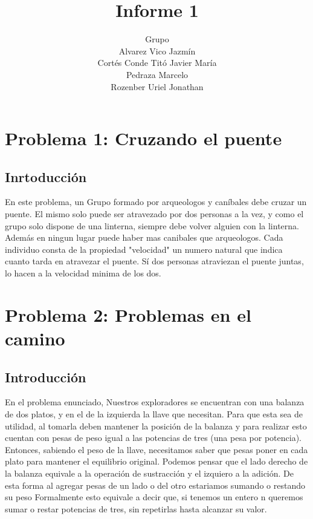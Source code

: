 \documentclass[spanish,12pt]{article}
\begin{document}
\title{Informe 1}

\author{Grupo  \\Alvarez Vico Jazm\'in\\Cortés Conde Titó Javier María\\Pedraza Marcelo \\ Rozenber Uriel Jonathan}


\maketitle

\clearpage

\tableofcontents
\cleardoublepage

\section{Problema 1: Cruzando el puente}

\subsection{Inrtoducción}

En este problema, un Grupo formado por arqueologos y caníbales debe cruzar un puente. El mismo solo puede ser atravezado por dos personas a la vez, y como el grupo solo dispone de una linterna, siempre debe volver alguien con la linterna. Además en ningun lugar puede haber mas canibales que arqueologos.
Cada individuo consta de la propiedad "velocidad" un numero natural que indica cuanto tarda en atravezar el puente. Sí dos personas atraviezan el puente juntas, lo hacen a la velocidad minima de los dos.

\section{Problema 2: Problemas en el camino}

\subsection{Introducción}

En el problema enunciado, Nuestros exploradores se encuentran con una balanza de dos platos, y en el de la izquierda la llave que necesitan. Para que esta sea de utilidad, al tomarla deben mantener la posición de la balanza y para realizar esto cuentan con pesas de peso igual a las potencias de tres (una pesa por potencia).
Entonces, sabiendo el peso de la llave, necesitamos saber que pesas poner en cada plato para mantener el equilibrio original.
Podemos pensar que el lado derecho de la balanza equivale a la operación de sustracción y el izquiero a la adición. De esta forma al agregar pesas de un lado o del otro estariamos sumando o restando su peso
Formalmente esto equivale a decir que, si tenemos un entero n queremos sumar o restar potencias de tres, sin repetirlas hasta alcanzar su valor.
\end{document}
